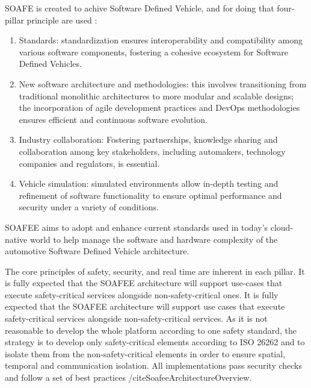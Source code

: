 SOAFE is created to achive Software Defined Vehicle, and for doing that four-pillar principle are used \cite{SoafeeProject}:
\begin{enumerate}
    \item Standards: standardization ensures interoperability and compatibility among various software components, fostering a cohesive ecosystem for Software Defined Vehicles.
    \item New software architecture and methodologies: this involves transitioning from traditional monolithic architectures to more modular and scalable designs; the incorporation of agile development practices and DevOps methodologies ensures efficient and continuous software evolution.
    \item Industry collaboration: Fostering partnerships, knowledge sharing and collaboration among key stakeholders, including automakers, technology companies and regulators, is essential.
    \item Vehicle simulation: simulated environments allow in-depth testing and refinement of software functionality to ensure optimal performance and security under a variety of conditions.
\end{enumerate}
SOAFEE aims to adopt and enhance current standards used in today's cloud-native world to help manage the software and hardware complexity of the automotive Software Defined Vehicle architecture.

The core principles of safety, security, and real time are inherent in each pillar. It is fully expected that the SOAFEE architecture will support use-cases that execute safety-critical services alongside non-safety-critical ones. It is fully expected that the SOAFEE architecture will support use cases that execute safety-critical services alongside non-safety-critical services. As it is not reasonable to develop the whole platform according to one safety standard, the strategy is to develop only safety-critical elements according to ISO 26262 and to isolate them from the non-safety-critical elements in order to ensure spatial, temporal and communication isolation. All implementations pass security checks and follow a set of best practices /cite{SoafeeArchitectureOverview}.

